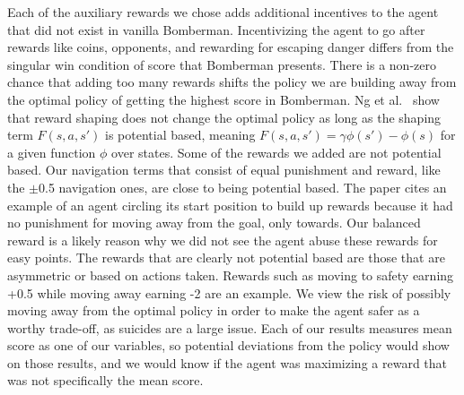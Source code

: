 \documentclass[article, 10pt]{IEEEtran}
\begin{document}
Each of the auxiliary rewards we chose adds additional incentives to the agent that did not exist in vanilla Bomberman. Incentivizing the agent to go after rewards like coins, opponents, and rewarding for escaping danger differs from the singular win condition of score that Bomberman presents. There is a non-zero chance that adding too many rewards shifts the policy we are building away from the optimal policy of getting the highest score in Bomberman. Ng et al.~\cite{ng1999policy} show that reward shaping does not change the optimal policy as long as the shaping term $F(s, a, s')$ is potential based, meaning $F(s, a, s') = \gamma \phi(s')-\phi(s)$ for a given function $\phi$ over states. Some of the rewards we added are not potential based. Our navigation terms that consist of equal punishment and reward, like the $\pm$0.5 navigation ones, are close to being potential based. The paper cites an example of an agent circling its start position to build up rewards because it had no punishment for moving away from the goal, only towards. Our balanced reward is a likely reason why we did not see the agent abuse these rewards for easy points. The rewards that are clearly not potential based are those that are asymmetric or based on actions taken. Rewards such as moving to safety earning +0.5 while moving away earning -2 are an example. We view the risk of possibly moving away from the optimal policy in order to make the agent safer as a worthy trade-off, as suicides are a large issue. Each of our results measures mean score as one of our variables, so potential deviations from the policy would show on those results, and we would know if the agent was maximizing a reward that was not specifically the mean score.




\end{document}

